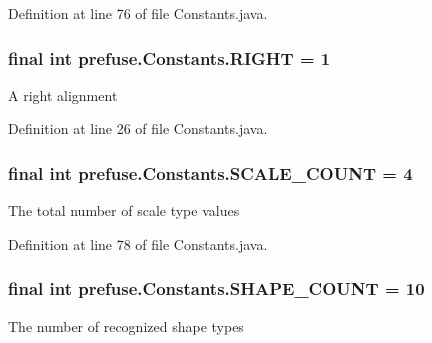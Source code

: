 \-Definition at line 76 of file \-Constants.\-java.

\hypertarget{interfaceprefuse_1_1_constants_a4a653c225b2257beabe7ab6a98f4d948}{
\subsubsection[{\-R\-I\-G\-H\-T}]{\setlength{\rightskip}{0pt plus 5cm}final int {\bf prefuse.\-Constants.\-R\-I\-G\-H\-T} = 1}}\label{interfaceprefuse_1_1_constants_a4a653c225b2257beabe7ab6a98f4d948}
\-A right alignment 

\-Definition at line 26 of file \-Constants.\-java.

\hypertarget{interfaceprefuse_1_1_constants_a90bcc12a5126e15cc4f8af3ba918bd1c}{
\subsubsection[{\-S\-C\-A\-L\-E\-\_\-\-C\-O\-U\-N\-T}]{\setlength{\rightskip}{0pt plus 5cm}final int {\bf prefuse.\-Constants.\-S\-C\-A\-L\-E\-\_\-\-C\-O\-U\-N\-T} = 4}}\label{interfaceprefuse_1_1_constants_a90bcc12a5126e15cc4f8af3ba918bd1c}
\-The total number of scale type values 

\-Definition at line 78 of file \-Constants.\-java.

\hypertarget{interfaceprefuse_1_1_constants_ae9a4848aafeb6df96b539414c2a3944b}{
\subsubsection[{\-S\-H\-A\-P\-E\-\_\-\-C\-O\-U\-N\-T}]{\setlength{\rightskip}{0pt plus 5cm}final int {\bf prefuse.\-Constants.\-S\-H\-A\-P\-E\-\_\-\-C\-O\-U\-N\-T} = 10}}\label{interfaceprefuse_1_1_constants_ae9a4848aafeb6df96b539414c2a3944b}
\-The number of recognized shape types 

